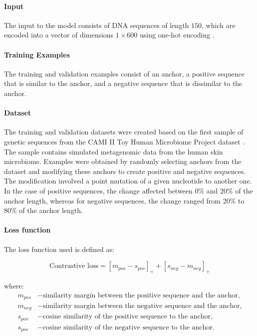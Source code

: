 \documentclass[pdflatex,sn-vancouver-num]{sn-jnl}%
\begin{document}
                \paragraph{Input}
                The input to the model consists of DNA sequences of length $150$, which are encoded into a vector of dimensions $1 \times 600$ using one-hot encoding \cite{HarrisDavid:2007}.

                \paragraph{Training Examples}
                The training and validation examples consist of an anchor, a positive sequence that is similar to the anchor, and a negative sequence that is dissimilar to the anchor.

                \paragraph{Dataset}
                The training and validation datasets were created based on the first sample of genetic sequences from the CAMI II Toy Human Microbiome Project dataset \cite{Fritz:2019}. The sample contains simulated metagenomic data from the human skin microbiome. Examples were obtained by randomly selecting anchors from the dataset and modifying these anchors to create positive and negative sequences. The modification involved a point mutation of a given nucleotide to another one. In the case of positive sequences, the change affected between 0\% and 20\% of the anchor length, whereas for negative sequences, the change ranged from 20\% to 80\% of the anchor length.

                \paragraph{Loss function}
                The loss function used is defined as:

                \begin{equation}
                    \text{Contrastive loss} = [m_{pos} - s_{pos}]_{+} + [s_{neg} - m_{neg}]_{+}
                \end{equation}

                where:
                \begin{align*}
                    m_{pos} &- \text{similarity margin between the positive sequence and the anchor,} \\
                    m_{neg} &- \text{similarity margin between the negative sequence and the anchor,} \\
                    s_{pos} &- \text{cosine similarity of the positive sequence to the anchor,} \\
                    s_{pos} &- \text{cosine similarity of the negative sequence to the anchor.} \\
                \end{align*}
\end{document}
